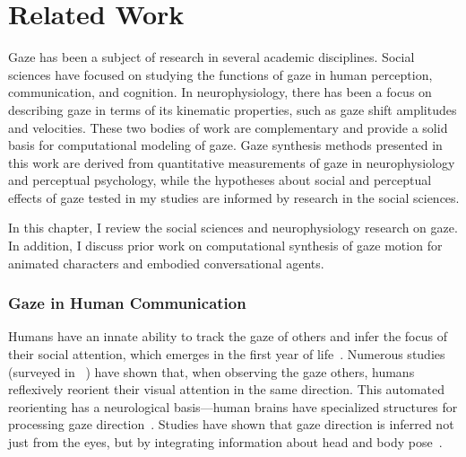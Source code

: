\pagestyle{deposit}

\chapter{Related Work}

Gaze has been a subject of research in several academic disciplines. Social sciences have focused on studying the functions of gaze in human perception, communication, and cognition. In neurophysiology, there has been a focus on describing gaze in terms of its kinematic properties, such as gaze shift amplitudes and velocities. These two bodies of work are complementary and provide a solid basis for computational modeling of gaze. Gaze synthesis methods presented in this work are derived from quantitative measurements of gaze in neurophysiology and perceptual psychology, while the hypotheses about social and perceptual effects of gaze tested in my studies are informed by research in the social sciences.

In this chapter, I review the social sciences and neurophysiology research on gaze. In addition, I discuss prior work on computational synthesis of gaze motion for animated characters and embodied conversational agents.

\subsection{Gaze in Human Communication}

Humans have an innate ability to track the gaze of others and infer the focus of their social attention, which emerges in the first year of life~\cite{scaife1975infant,vecera1995detection}. Numerous studies (surveyed in ~\cite{langton2000eyes}) have shown that, when observing the gaze others, humans reflexively reorient their visual attention in the same direction. This automated reorienting has a neurological basis---human brains have specialized structures for processing gaze direction~\cite{emery2000eyes}. Studies have shown that gaze direction is inferred not just from the eyes, but by integrating information about head and body pose~\cite{hietanen1999does,langton2000eyes,hietanen2002social,pomianowska2011socialcues}.


